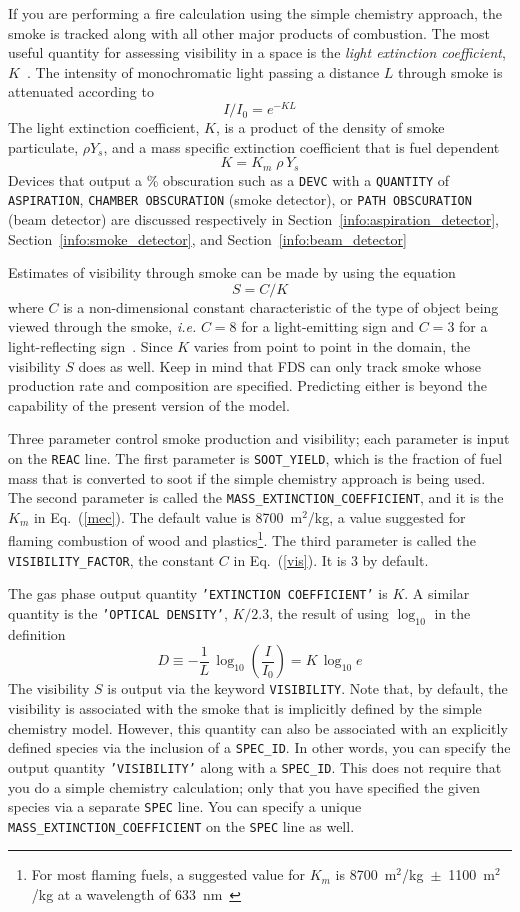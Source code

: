 \documentclass[11pt]{book}
\newcommand{\ct}{\tt\small}
\newcommand{\be}{\begin{equation}}
\newcommand{\ee}{\end{equation}}
\begin{document}
If you are performing a fire calculation using the simple chemistry
approach, the smoke is tracked along with all other major products of
combustion. The most useful quantity for assessing visibility in a
space is the {\em light extinction coefficient},
$K$~\cite{SFPE:Mulholland}. The intensity of monochromatic light
passing a distance $L$ through smoke is attenuated according to
\be I/I_0 = e^{-KL} \ee
The light extinction coefficient, $K$, is a product of the
density of smoke particulate, $\rho Y_s$, and a mass specific
extinction coefficient that is fuel dependent
\be K = K_m \; \rho \, Y_s \label{mec} \ee
Devices that output a \% obscuration such as a {\ct DEVC} with a {\ct QUANTITY} of {\ct ASPIRATION}, {\ct CHAMBER OBSCURATION} (smoke
detector), or {\ct PATH OBSCURATION} (beam detector) are discussed
respectively in Section~\ref{info:aspiration_detector},
Section~\ref{info:smoke_detector}, and Section~\ref{info:beam_detector}

Estimates of visibility through smoke can be made by using the
equation
\be  S = C/K  \label{vis}  \ee
where $C$ is a non-dimensional constant characteristic of
the type of object being viewed through the smoke, {\em i.e.}
$C=8$ for a light-emitting sign and $C=3$ for a light-reflecting
sign~\cite{SFPE:Mulholland}. Since $K$ varies from point to point in the
domain, the visibility $S$ does as well. Keep in mind that
FDS can only track smoke whose production rate and composition
are specified. Predicting either is beyond the
capability of the present version of the model.

Three parameter control smoke production and visibility; each
parameter is input on the {\ct REAC} line. The first parameter
is {\ct SOOT\_YIELD}, which is the fraction of fuel mass that
is converted to soot if the simple chemistry approach is being used. The second parameter is called the
{\ct MASS\_EXTINCTION\_COEFFICIENT}, and it is the $K_m$ in
Eq.~(\ref{mec}). The default value is 8700~m$^2$/kg, a value
suggested for flaming combustion of wood and plastics\footnote{For most flaming fuels, a suggested value for $K_m$ is 8700~m$^2$/kg~$\pm$~1100~m$^2$/kg at a
wavelength of 633~nm~\cite{Mulholland:F+M}}.
The third parameter is called the {\ct VISIBILITY\_FACTOR}, the
constant $C$ in Eq.~(\ref{vis}). It is 3 by default.

The gas phase output quantity {\ct 'EXTINCTION COEFFICIENT'} is $K$. A similar quantity is the
{\ct 'OPTICAL DENSITY'}, $K/2.3$, the result of using $\log_{10}$ in the definition
\be D \equiv - \frac{1}{L} \, \log_{10} \left( \frac{I}{I_0} \right) = K \, \log_{10} e   \ee
The visibility $S$ is output via the keyword {\ct VISIBILITY}. Note
that, by default, the visibility is associated with the smoke that is implicitly defined by the simple chemistry
model. However, this quantity can also be associated with an
explicitly defined species via the inclusion of a {\ct SPEC\_ID}.
In other words, you can specify the output quantity {\ct 'VISIBILITY'} along with a {\ct SPEC\_ID}.
This does not require that you do a simple chemistry calculation; only that you have specified the given species via a separate
{\ct SPEC} line. You can
specify a unique {\ct MASS\_EXTINCTION\_COEFFICIENT} on the {\ct SPEC} line as well.
\end{document}
